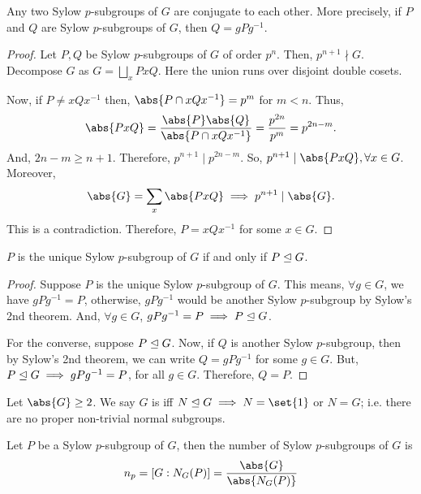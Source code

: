\documentclass[11pt]{penrose}
\begin{document}
\begin{nthm}
    Any two Sylow $p$-subgroups of $G$ are conjugate to each other. More precisely, if $P$ and $Q$ are Sylow $p$-subgroups of $G$, then $Q = gPg^{-1}$.
\end{nthm}
\begin{proof}
    Let $P, Q$ be Sylow $p$-subgroups of $G$ of order $p^{n}$. Then, $p^{n+1} \nmid G$. Decompose $G$ as $\displaystyle G = \bigsqcup_{x} PxQ$. Here the union runs over disjoint double cosets.

    Now, if $P \neq xQx^{-1}$ then, $\abs{P \cap x Q x^{-1}} = p^{m}$ for $m < n$. Thus,
    \begin{equation*}
        \abs{PxQ}
        = \frac{\abs{P}\abs{Q}}{\abs{P \cap x Q x^{-1}}}
        = \frac{p^{2n}}{p^{m}}
        = p^{2n-m}.
    \end{equation*}
    And, $2n-m \geq n+1$. Therefore, $p^{n+1} \mid p^{2n-m}$. So, $p^{n+1} \mid \abs{PxQ}, \forall x \in G$. Moreover,
    \begin{equation*}
        \abs{G} = \sum_{x} \abs{PxQ}
        \implies
        p^{n+1} \mid \abs{G}.
    \end{equation*}
    This is a contradiction. Therefore, $P = xQx^{-1}$ for some $x \in G$.
\end{proof}

\begin{ncor}
    $P$ is the unique Sylow $p$-subgroup of $G$ if and only if $P \mathrel{\trianglelefteq} G$.
\end{ncor}
\begin{proof}
    Suppose $P$ is the unique Sylow $p$-subgroup of $G$. This means, $\forall g \in G$, we have $gPg^{-1} = P$, otherwise, $gPg^{-1}$ would be another Sylow $p$-subgroup by Sylow's 2nd theorem. And, $\forall g \in G$, $gPg^{-1} = P \implies P \mathrel{\trianglelefteq} G$.

    For the converse, suppose $P \mathrel{\trianglelefteq} G$. Now, if $Q$ is another Sylow $p$-subgroup, then by Sylow's 2nd theorem, we can write $Q = gPg^{-1}$ for some $g \in G$. But, $P \mathrel{\trianglelefteq} G \implies gPg^{-1} = P$, for all $g \in G$. Therefore, $Q = P$.
\end{proof}

\begin{ndfn}
    Let $\abs{G} \geq 2$. We say $G$ is  iff $N \nsubgroup G \implies N = \set{1}$ or $N = G$; i.e. there are no proper non-trivial normal subgroups.
\end{ndfn}

\begin{nlemma}
    Let $P$ be a Sylow $p$-subgroup of $G$, then the number of Sylow $p$-subgroups of $G$ is
    \begin{equation*}
        n_{p} = [G : N_{G}(P)] = \frac{ \abs{G} }{ \abs{N_{G}(P)} }
    \end{equation*}
\end{nlemma}
\end{document}
